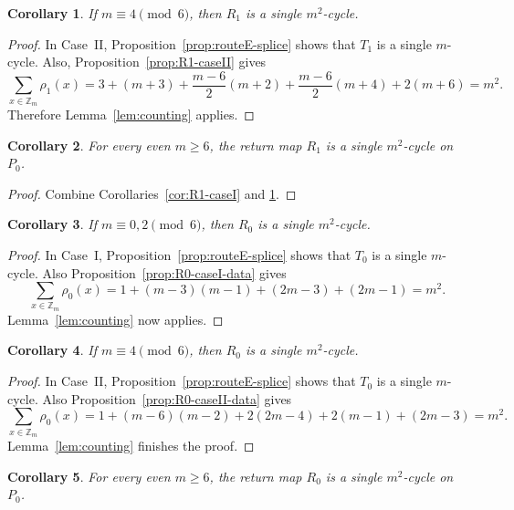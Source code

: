 \documentclass[11pt]{article}
\newtheorem{corollary}{Corollary}
\newcommand{\Zm}{\mathbb Z_m}
\begin{document}
\begin{corollary}\label{cor:R1-caseII}
If $m\equiv 4\pmod 6$, then $R_1$ is a single $m^2$-cycle.
\end{corollary}

\begin{proof}
In Case~II, Proposition~\ref{prop:routeE-splice} shows that $T_1$ is a single $m$-cycle.
Also, Proposition~\ref{prop:R1-caseII} gives
\[
\sum_{x\in \Zm}\rho_1(x)
=
3+(m+3)+\frac{m-6}{2}(m+2)+\frac{m-6}{2}(m+4)+2(m+6)=m^2.
\]
Therefore Lemma~\ref{lem:counting} applies.
\end{proof}

\begin{corollary}\label{cor:R1-all}
For every even $m\ge 6$, the return map $R_1$ is a single $m^2$-cycle on $P_0$.
\end{corollary}

\begin{proof}
Combine Corollaries~\ref{cor:R1-caseI} and \ref{cor:R1-caseII}.
\end{proof}

\begin{corollary}\label{cor:R0-caseI}
If $m\equiv 0,2\pmod 6$, then $R_0$ is a single $m^2$-cycle.
\end{corollary}

\begin{proof}
In Case~I, Proposition~\ref{prop:routeE-splice} shows that $T_0$ is a single $m$-cycle.
Also Proposition~\ref{prop:R0-caseI-data} gives
\[
\sum_{x\in \Zm}\rho_0(x)=1+(m-3)(m-1)+(2m-3)+(2m-1)=m^2.
\]
Lemma~\ref{lem:counting} now applies.
\end{proof}

\begin{corollary}\label{cor:R0-caseII}
If $m\equiv 4\pmod 6$, then $R_0$ is a single $m^2$-cycle.
\end{corollary}

\begin{proof}
In Case~II, Proposition~\ref{prop:routeE-splice} shows that $T_0$ is a single $m$-cycle.
Also Proposition~\ref{prop:R0-caseII-data} gives
\[
\sum_{x\in \Zm}\rho_0(x)=1+(m-6)(m-2)+2(2m-4)+2(m-1)+(2m-3)=m^2.
\]
Lemma~\ref{lem:counting} finishes the proof.
\end{proof}

\begin{corollary}\label{cor:R0-all}
For every even $m\ge 6$, the return map $R_0$ is a single $m^2$-cycle on $P_0$.
\end{corollary}
\end{document}
